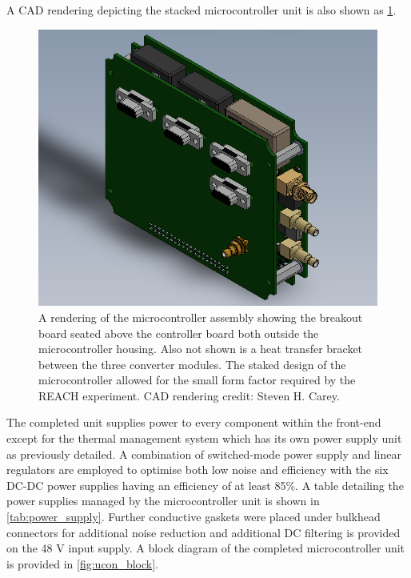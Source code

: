 A CAD rendering depicting the stacked microcontroller unit is also shown as \cref{fig:ucon_cad}.
\begin{figure}
    \centering
    \includegraphics[scale=0.4]{stacked_ucon}
    \caption{A rendering of the microcontroller assembly showing the breakout board seated above the controller board both outside the microcontroller housing. Also not shown is a heat transfer bracket between the three converter modules. The staked design of the microcontroller allowed for the small form factor required by the REACH experiment. CAD rendering credit: Steven H. Carey.}
    \label{fig:ucon_cad}
\end{figure}
The completed unit supplies power to every component within the front-end except for the thermal management system which has its own power supply unit as previously detailed. A combination of switched-mode power supply and linear regulators are employed to optimise both low noise and efficiency with the six DC-DC power supplies having an efficiency of at least 85\%. A table detailing the power supplies managed by the microcontroller unit is shown in \cref{tab:power_supply}. Further conductive gaskets were placed under bulkhead connectors for additional noise reduction and additional DC filtering is provided on the 48 V input supply. A block diagram of the completed microcontroller unit is provided in \cref{fig:ucon_block}.
